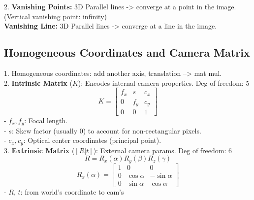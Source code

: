 2. \textbf{Vanishing Points:} 3D Parallel lines -> converge at a point in the image. (Vertical vanishing point: infinity)\\
\textbf{Vanishing Line:} 3D Parallel lines -> converge at a line in the image.

\subsection*{Homogeneous Coordinates and Camera Matrix}
1. Homogeneous coordinates: add another axis, translation --> mat mul. \\
2. \textbf{Intrinsic Matrix} (\(K\)): Encodes internal camera properties. Deg of freedom: 5
   \[
   K = 
   \begin{bmatrix}
   f_x & s & c_x \\
   0 & f_y & c_y \\
   0 & 0 & 1
   \end{bmatrix}
   \]
   - \(f_x, f_y\): Focal length. \\
   - \(s\): Skew factor (usually 0) to account for non-rectangular pixels. \\
   - \(c_x, c_y\): Optical center coordinates (principal point). \\
3. \textbf{Extrinsic Matrix} (\([R | t]\)): External camera params. Deg of freedom: 6\\
   \[
   R = R_x(\alpha) R_y(\beta) R_z(\gamma)
   \]
   \[
   R_x(\alpha) = 
   \begin{bmatrix}
   1 & 0 & 0 \\
   0 & \cos \alpha & -\sin \alpha \\
   0 & \sin \alpha & \cos \alpha
   \end{bmatrix}
   \]
   - \(R\), \(t\): from world's coordinate to cam's


